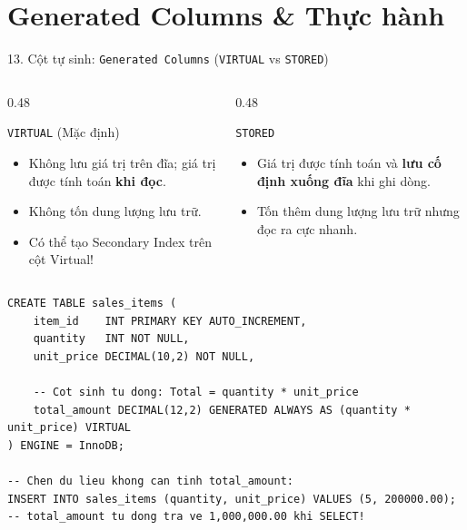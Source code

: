 \documentclass[aspectratio=169,11pt]{beamer}
\newcommand{\kw}[1]{\textcolor{dbblue}{\textbf{#1}}}
\newcommand{\smallgap}{\vspace{0.2em}}
\begin{document}
\section{Generated Columns \& Thực hành}
\begin{frame}[fragile]{13. Cột tự sinh: \texttt{Generated Columns} (\texttt{VIRTUAL} vs \texttt{STORED})}
\begin{columns}[t]
  \begin{column}{0.48\textwidth}
    \begin{block}{\texttt{VIRTUAL} (Mặc định)}
      \begin{itemize}\setlength{\itemsep}{1.5pt}
        \item Không lưu giá trị trên đĩa; giá trị được tính toán \kw{khi đọc}.
        \item Không tốn dung lượng lưu trữ.
        \item Có thể tạo Secondary Index trên cột Virtual!
      \end{itemize}
    \end{block}
  \end{column}
  \begin{column}{0.48\textwidth}
    \begin{block}{\texttt{STORED}}
      \begin{itemize}\setlength{\itemsep}{1.5pt}
        \item Giá trị được tính toán và \kw{lưu cố định xuống đĩa} khi ghi dòng.
        \item Tốn thêm dung lượng lưu trữ nhưng đọc ra cực nhanh.
      \end{itemize}
    \end{block}
  \end{column}
\end{columns}

\smallgap
\begin{lstlisting}
CREATE TABLE sales_items (
    item_id    INT PRIMARY KEY AUTO_INCREMENT,
    quantity   INT NOT NULL,
    unit_price DECIMAL(10,2) NOT NULL,
    
    -- Cot sinh tu dong: Total = quantity * unit_price
    total_amount DECIMAL(12,2) GENERATED ALWAYS AS (quantity * unit_price) VIRTUAL
) ENGINE = InnoDB;

-- Chen du lieu khong can tinh total_amount:
INSERT INTO sales_items (quantity, unit_price) VALUES (5, 200000.00);
-- total_amount tu dong tra ve 1,000,000.00 khi SELECT!
\end{lstlisting}
\end{frame}
\end{document}
